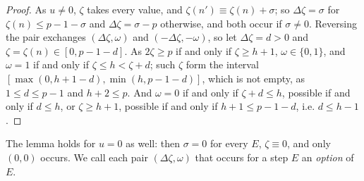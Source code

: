 \documentclass[11pt]{amsart}
\theoremstyle{definition}
\theoremstyle{plain}
\begin{document}
\begin{proof}
As $u\ne0$, $\zeta$ takes every value, and $\zeta(n')\equiv\zeta(n)+\sigma$; so $\Delta\zeta=\sigma$ for $\zeta(n)\le p-1-\sigma$ and $\Delta\zeta=\sigma-p$ otherwise, and both occur if $\sigma\ne0$. Reversing the pair exchanges $(\Delta\zeta,\omega)$ and $(-\Delta\zeta,-\omega)$, so let $\Delta\zeta=d>0$ and $\zeta=\zeta(n)\in[0,p-1-d]$. As $2\zeta\ge p$ if and only if $\zeta\ge h+1$, $\omega\in\{0,1\}$, and $\omega=1$ if and only if $\zeta\le h<\zeta+d$; such $\zeta$ form the interval $[\max(0,h+1-d),\min(h,p-1-d)]$, which is not empty, as $1\le d\le p-1$ and $h+2\le p$. And $\omega=0$ if and only if $\zeta+d\le h$, possible if and only if $d\le h$, or $\zeta\ge h+1$, possible if and only if $h+1\le p-1-d$, i.e. $d\le h-1$.
\end{proof}

The lemma holds for $u=0$ as well: then $\sigma=0$ for every $E$, $\zeta\equiv0$, and only $(0,0)$ occurs. We call each pair $(\Delta\zeta,\omega)$ that occurs for a step $E$ an \emph{option} of $E$.
\end{document}
